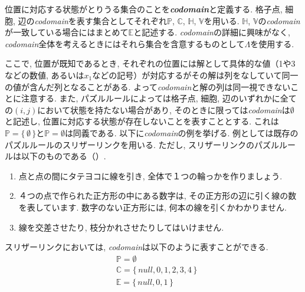 \begin{definition}\label{definition:Codomain}
  位置に対応する状態がとりうる集合のことを\textbf{\textit{codomain}}と定義する. 格子点, 細胞, 辺の\textit{codomain}を表す集合としてそれぞれ$\mathbb{P}$, $\mathbb{C}$, $\mathbb{H}$, $\mathbb{V}$を用いる. $\mathbb{H}$, $\mathbb{V}$の\textit{codomain}が一致している場合にはまとめて$\mathbb{E}$と記述する. \textit{codomain}の詳細に興味がなく, \textit{codomain}全体を考えるときにはそれら集合を含意するものとして$\Lambda$を使用する.
\end{definition}

ここで, 位置が既知であるとき, それぞれの位置には解として具体的な値（1や3などの数値, あるいは$x_1$などの記号）が対応するがその解は列をなしていて同一の値が含んだ列となることがある.
よって\textit{codomain}と解の列は同一視できないことに注意する. また, パズルルールによっては格子点, 細胞, 辺のいずれかに全ての$(i,j)$において状態を持たない場合があり, そのときに限っては\textit{codomain}は$\emptyset$と記述し, 位置に対応する状態が存在しないことを表すこととする. これは$\mathbb{P}=\{\,\emptyset\,\}$と$\mathbb{P}=\emptyset$は同義である. 以下に\textit{codomain}の例を挙げる. 例としては既存のパズルルールのスリザーリンクを用いる. ただし, スリザーリンクのパズルルールは以下のものである（\cite{web:SlitherLink}）.
\begin{example}[スリザーリンクのパズルルール]\label{example:SlitherLinkRule}\textup{}
  \begin{enumerate}
    \item 点と点の間にタテヨコに線を引き, 全体で１つの輪っかを作りましょう.\label{SlitherLinkRule_1}
    \item ４つの点で作られた正方形の中にある数字は, その正方形の辺に引く線の数を表しています. 数字のない正方形には, 何本の線を引くかわかりません.\label{SlitherLinkRule_2}
    \item 線を交差させたり, 枝分かれさせたりしてはいけません.\label{SlitherLinkRule_3}
  \end{enumerate}
\end{example}

\begin{example}\label{example:SlitherLinkCodomain}
  スリザーリンクにおいては, \textit{codomain}は以下のように表すことができる.
  \begin{align}
     & \mathbb{P}  =  \emptyset                       \\
     & \mathbb{C}  =  \{\,\textit{null},0,1,2,3,4\,\} \\
     & \mathbb{E}  =  \{\,\textit{null},0,1\,\}
  \end{align}
\end{example}

